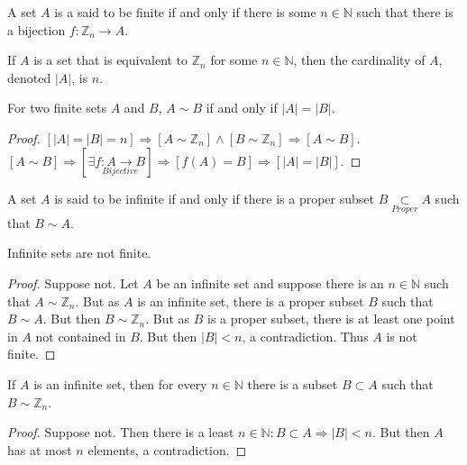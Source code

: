         \begin{definition}
        A set $A$ is a said to be finite if and only if there is some $n\in \mathbb{N}$ such
        that there is a bijection $f:\mathbb{Z}_n \rightarrow A$.
        \end{definition}
        \begin{definition}
        If $A$ is a set that is equivalent to $\mathbb{Z}_n$ for some $n\in \mathbb{N}$,
        then the cardinality of $A$, denoted $|A|$, is $n$.
        \end{definition}
        \begin{theorem}
        For two finite sets $A$ and $B$, $A\sim B$ if and only if $|A|=|B|$.
        \end{theorem}
        \begin{proof}
        $[|A|=|B|=n]\Rightarrow[A\sim \mathbb{Z}_n]\land[B\sim \mathbb{Z}_n]\Rightarrow [A\sim B]$.
        $[A\sim B]\Rightarrow [\exists \underset{Bijective}{f:A\rightarrow B}]\Rightarrow [f(A) = B]\Rightarrow [|A|=|B|]$.
        \end{proof}
        \begin{definition}
        A set $A$ is said to be infinite if and only if there is a proper subset $B\underset{Proper}\subset A$ such that $B\sim A$.
        \end{definition}
        \begin{theorem}
        Infinite sets are not finite.
        \end{theorem}
        \begin{proof}
        Suppose not. Let $A$ be an infinite set and suppose there is an $n\in \mathbb{N}$ such
        that $A\sim \mathbb{Z}_n$. But as $A$ is an infinite set, there is a proper subset $B$
        such that $B\sim A$. But then $B\sim \mathbb{Z}_n$. But as $B$ is a proper subset,
        there is at least one point in $A$ not contained in $B$. But then $|B|<n$, a contradiction. Thus $A$ is not finite.
        \end{proof}
        \begin{corollary}
        If $A$ is an infinite set, then for every $n\in \mathbb{N}$ there is a subset $B\subset A$ such that $B\sim \mathbb{Z}_n$.
        \end{corollary}
        \begin{proof}
        Suppose not. Then there is a least $n\in \mathbb{N}:B\subset A\Rightarrow |B|<n$.
        But then $A$ has at most $n$ elements, a contradiction.
        \end{proof}
